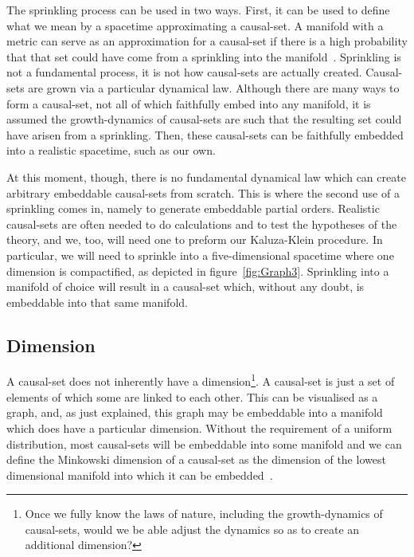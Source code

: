 \documentclass[a4paper,12pt]{article}
\numberwithin{equation}{section}
\begin{document}
The sprinkling process can be used in two ways. First, it can be used to define what we mean by a spacetime approximating a causal-set. A manifold with a metric can serve as an approximation for a causal-set if there is a high probability that that set could have come from a sprinkling into the manifold~\cite{Henson2009}. Sprinkling is not a fundamental process, it is not how causal-sets are actually created. Causal-sets are grown via a particular dynamical law. Although there are many ways to form a causal-set, not all of which faithfully embed into any manifold, it is assumed the growth-dynamics of causal-sets are such that the resulting set could have arisen from a sprinkling. Then, these causal-sets can be faithfully embedded into a realistic spacetime, such as our own.

At this moment, though, there is no fundamental dynamical law which can create arbitrary embeddable causal-sets from scratch. This is where the second use of a sprinkling comes in, namely to generate embeddable partial orders. Realistic causal-sets are often needed to do calculations and to test the hypotheses of the theory, and we, too, will need one to preform our Kaluza-Klein procedure. In particular, we will need to sprinkle into a five-dimensional spacetime where one dimension is compactified, as depicted in figure~\ref{fig:Graph3}. Sprinkling into a manifold of choice will result in a causal-set which, without any doubt, is embeddable into that same manifold.


\subsection{Dimension}
\label{sec:Dimension}

A causal-set does not inherently have a dimension\footnote{Once we fully know the laws of nature, including the growth-dynamics of causal-sets, would we be able adjust the dynamics so as to create an additional dimension?}. A causal-set is just a set of elements of which some are linked to each other. This can be visualised as a graph, and, as just explained, this graph may be embeddable into a manifold which does have a particular dimension. Without the requirement of a uniform distribution, most causal-sets will be embeddable into some manifold and we can define the Minkowski dimension of a causal-set as the dimension of the lowest dimensional manifold into which it can be embedded~\cite{Meyer1988}.
\end{document}
